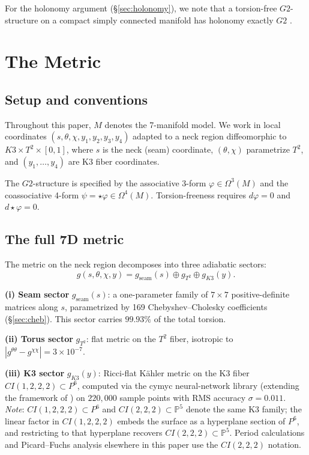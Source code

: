 \documentclass[11pt,a4paper]{article}
\theoremstyle{definition}
\theoremstyle{remark}
\newcommand{\CIvvv}{\mathrm{CI}(2,2,2)}
\newcommand{\CIvvvv}{\mathrm{CI}(1,2,2,2)}
\newcommand{\Psix}{\mathbb{P}^6}
\newcommand{\Gtwo}{\mathrm{G}_2}
\def\CIvvv{CI(2,2,2)}%
\def\CIvvvv{CI(1,2,2,2)}%
\def\Psix{P^6}%
\def\Gtwo{G2}%
\begin{document}
For the holonomy argument (§\ref{sec:holonomy}), we note that a torsion-free $\Gtwo$-structure on a compact simply connected manifold has holonomy exactly $\Gtwo$ \cite[Prop.~11.2.3]{Joyce2000}.

\section{The Metric}\label{sec:metric}

\subsection{Setup and conventions}

Throughout this paper, $M$ denotes the 7-manifold model. We work in local coordinates $(s, \theta, \chi, y_1, y_2, y_3, y_4)$ adapted to a neck region diffeomorphic to $K3 \times T^2 \times [0, 1]$, where $s$ is the neck (seam) coordinate, $(\theta, \chi)$ parametrize $T^2$, and $(y_1, \ldots, y_4)$ are K3 fiber coordinates.

The $\Gtwo$-structure is specified by the associative 3-form $\varphi \in \Omega^3(M)$ and the coassociative 4-form $\psi = \star\varphi \in \Omega^4(M)$. Torsion-freeness requires $d\varphi = 0$ and $d\star\varphi = 0$.

\subsection{The full 7D metric}

The metric on the neck region decomposes into three adiabatic sectors:
\begin{equation}
g(s, \theta, \chi, y) = g_{\mathrm{seam}}(s) \oplus g_{T^2} \oplus g_{K3}(y).
\end{equation}

\textbf{(i) Seam sector} $g_{\mathrm{seam}}(s)$: a one-parameter family of $7 \times 7$ positive-definite matrices along $s$, parametrized by 169 Chebyshev--Cholesky coefficients (§\ref{sec:cheb}). This sector carries $99.93\%$ of the total torsion.

\textbf{(ii) Torus sector} $g_{T^2}$: flat metric on the $T^2$ fiber, isotropic to $|g^{\theta\theta} - g^{\chi\chi}| = 3 \times 10^{-7}$.

\textbf{(iii) K3 sector} $g_{K3}(y)$: Ricci-flat K\"ahler metric on the K3 fiber $\CIvvvv \subset \Psix$, computed via the cymyc neural-network library \cite{cymyc2024} (extending the framework of \cite{LarforsLukasRuehle2022}) on $220{,}000$ sample points with RMS accuracy $\sigma = 0.011$. \emph{Note}: $\CIvvvv \subset \Psix$ and $\CIvvv \subset \mathbb{P}^5$ denote the same K3 family; the linear factor in $\CIvvvv$ embeds the surface as a hyperplane section of $\Psix$, and restricting to that hyperplane recovers $\CIvvv \subset \mathbb{P}^5$. Period calculations and Picard--Fuchs analysis elsewhere in this paper use the $\CIvvv$ notation.
\end{document}

